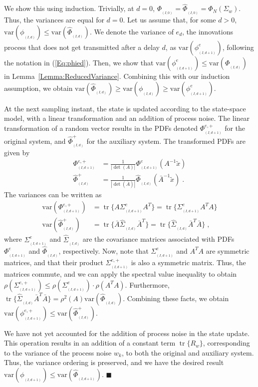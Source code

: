 \documentclass[twocolumn]{autart}
\DeclareMathOperator{\tr}{tr}
\newenvironment{proof}[1][Proof]{\begin{trivlist}
\item[\hskip \labelsep {\bfseries #1}]}{\end{trivlist}}
\renewcommand{\qed}{$\blacksquare$}
\begin{document}
\begin{proof}
We show this using induction. Trivially, at $d=0$, $\Phi_{_{(I,0)}} = \hat{\Phi}_{_{(I,0)}} = \Phi_N(\Sigma_w)$. Thus, the variances are equal for $d=0$. Let us assume that, for some $d > 0$, $\mathrm{var}(\phi_{_{(I,d)}}) \le \mathrm{var}(\hat{\Phi}_{_{(I,d)}})$. We denote the variance of $e_d$, the innovations process that does not get transmitted after a delay $d$, as $\mathrm{var}(\phi^{e}_{_{(I,d+1)}})$, following the notation in (\ref{Eq:phied}). Then, we show that $\mathrm{var}(\phi^{e}_{_{(I,d+1)}}) \le \mathrm{var}(\Phi_{_{(I,d)}})$ in Lemma~\ref{Lemma:ReducedVariance}. Combining this with our induction assumption, we obtain $\mathrm{var}(\hat{\Phi}_{_{(I,d)}}) \ge \mathrm{var}(\phi_{_{(I,d)}}) \ge \mathrm{var}(\phi^{e}_{_{(I,d+1)}})$.

At the next sampling instant, the state is updated according to the state-space model, with a linear transformation and an addition of process noise. The linear transformation of a random vector results in the PDFs denoted $\Phi^{e,+}_{_{(I,d+1)}}$ for the original system, and $\hat{\Phi}^{+}_{_{(I,d)}}$ for the auxiliary system. The transformed PDFs are given by
\begin{align*}
\Phi^{e,+}_{_{(I,d+1)}} &= \frac{1}{|\det(A)|} \Phi^e_{_{(I,d+1)}}(A^{-1} \tilde{x}) \\
\hat{\Phi}^{+}_{_{(I,d)}} &= \frac{1}{|\det(\bar{A})|} \hat{\Phi}_{_{(I,d)}}(\bar{A}^{-1} \tilde{x}) \; .
\end{align*}
The variances can be written as
\begin{align*}
\mathrm{var}(\Phi^{e,+}_{_{(I,d+1)}}) &= \tr\{ A \Sigma^e_{_{(I,d+1)}} A^T\} = \tr\{ \Sigma^e_{_{(I,d+1)}} A^T A \} \\
\mathrm{var}(\hat{\Phi}^{+}_{_{(I,d)}}) &= \tr\{ \bar{A} \hat{\Sigma}_{_{(I,d)}} \bar{A}^T\} = \tr\{ \hat{\Sigma}_{_{(I,d)}} \bar{A}^T \bar{A} \} \; ,
\end{align*}
where $\Sigma^e_{_{(I,d+1)}}$ and $\hat{\Sigma}_{_{(I,d)}}$ are the covariance matrices associated with PDFs $\Phi^e_{_{(I,d+1)}}$ and $\hat{\Phi}_{_{(I,d)}}$, respectively. Now, note that $\Sigma^e_{_{(I,d+1)}}$ and $A^T A$ are symmetric matrices, and that their product $\Sigma^{e,+}_{_{(I,d+1)}}$ is also a symmetric matrix. Thus, the matrices commute, and we can apply the spectral value inequality to obtain $\rho(\Sigma^{e,+}_{_{(I,d+1)}}) \le \rho(\Sigma^e_{_{(I,d+1)}}) \cdot \rho(A^T A)$. Furthermore, $\tr\{ \hat{\Sigma}_{_{(I,d)}} \bar{A}^T \bar{A} \} = \rho^2(A) \mathrm{var}(\hat{\Phi}_{_{(I,d)}})$. Combining these facts, we obtain $\mathrm{var}(\phi^{e,+}_{_{(I,d+1)}}) \le \mathrm{var}(\hat{\Phi}^{+}_{_{(I,d)}})$.

We have not yet accounted for the addition of process noise in the state update. This operation results in an addition of a constant term $\tr\{R_w\}$, corresponding to the variance of the process noise $w_k$, to both the original and auxiliary system. Thus, the variance ordering is preserved, and we have the desired result $\mathrm{var}(\phi_{_{(I,d+1)}}) \le \mathrm{var}(\hat{\Phi}_{_{(I,d+1)}})$. \hfill \qed
\end{proof}
\end{document}
